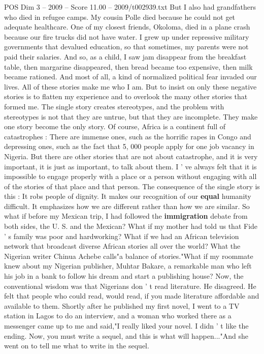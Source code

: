 \begin{textsample}{POS Dim 3 – 2009 – Score 11.00 – 2009/t002939.txt}
But I also had grandfathers who died in refugee camps.
My cousin Polle died because he could not get adequate healthcare.
One of my closest friends, Okoloma, died in a plane crash because our fire trucks did not have water.
I grew up under repressive military governments that devalued education, so that sometimes, my parents were not paid their salaries.
And so, as a child, I saw jam disappear from the breakfast table, then margarine disappeared, then bread became too expensive, then milk became rationed.
And most of all, a kind of normalized political fear invaded our lives.
All of these stories make me who I am.
But to insist on only these negative stories is to flatten my experience and to overlook the many other stories that formed me.
The single story creates stereotypes, and the problem with stereotypes is not that they are untrue, but that they are incomplete.
They make one story become the only story.
Of course, Africa is a continent full of catastrophes : There are immense ones, such as the horrific rapes in Congo and depressing ones, such as the fact that 5, 000 people apply for one job vacancy in Nigeria.
But there are other stories that are not about catastrophe, and it is very important, it is just as important, to talk about them.
I ' ve always felt that it is impossible to engage properly with a place or a person without engaging with all of the stories of that place and that person.
The consequence of the single story is this : It robs people of dignity.
It makes our recognition of our \textbf{equal} humanity difficult.
It emphasizes how we are different rather than how we are similar.
So what if before my Mexican trip, I had followed the \textbf{immigration} debate from both sides, the U.
S. and the Mexican?
What if my mother had told us that Fide ' s family was poor and hardworking?
What if we had an African television network that broadcast diverse African stories all over the world?
What the Nigerian writer Chinua Achebe calls"a balance of stories."What if my roommate knew about my Nigerian publisher, Muhtar Bakare, a remarkable man who left his job in a bank to follow his dream and start a publishing house?
Now, the conventional wisdom was that Nigerians don ' t read literature.
He disagreed.
He felt that people who could read, would read, if you made literature affordable and available to them.
Shortly after he published my first novel, I went to a TV station in Lagos to do an interview, and a woman who worked there as a messenger came up to me and said,"I really liked your novel.
I didn ' t like the ending.
Now, you must write a sequel, and this is what will happen..."And she went on to tell me what to write in the sequel.

\end{textsample}

